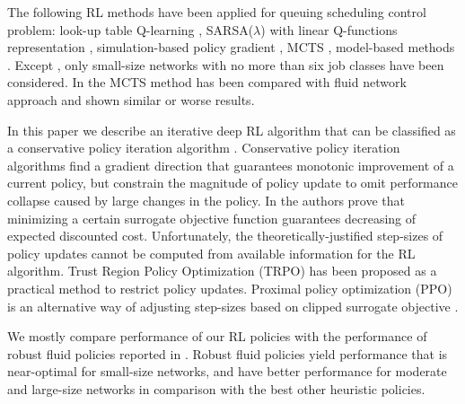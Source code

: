 \documentclass[11pt]{article}
\theoremstyle{definition}
\numberwithin{equation}{section}
\begin{document}
The following RL methods have been applied for queuing scheduling control problem: look-up table Q-learning \cite{Ramirez-Hernandez}, SARSA($\lambda$) with linear Q-functions representation \cite{Ramirez-Hernandez2007a},  simulation-based policy gradient \cite{Paschalidis2004}, MCTS \cite{Bertsimas2017}, model-based methods \cite{Liu2019}. Except \cite{Bertsimas2017} , only small-size networks with no more than six job classes have been considered. In \cite{Bertsimas2017} the MCTS method has been compared with fluid network approach \cite{Bertsimas2015} and shown similar or worse results.

In this paper we describe an iterative deep RL algorithm that can be classified as a  conservative policy iteration algorithm \cite{Kakade2002}. Conservative policy iteration algorithms find a gradient direction that  guarantees monotonic improvement of a current policy, but constrain the magnitude of policy update to omit performance collapse caused by large changes in the policy.
In  \cite{Schulman2015} the authors prove that minimizing a certain surrogate objective function guarantees decreasing of expected discounted cost. Unfortunately, the theoretically-justified step-sizes of policy updates cannot be computed from available information for the RL algorithm.  Trust Region Policy Optimization (TRPO) \cite{Schulman2015} has been proposed as a practical method to restrict policy updates. Proximal policy optimization (PPO) is an alternative way of adjusting step-sizes based on clipped surrogate objective \cite{Schulman2017}.  



We mostly compare performance of our RL policies with the performance of robust fluid policies reported in \cite{Bertsimas2015}.  Robust fluid policies yield performance that is near-optimal for small-size networks, and have better performance for moderate and large-size networks in comparison with  the best other heuristic policies. 
\end{document}
